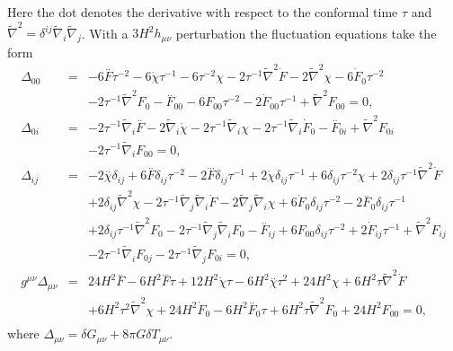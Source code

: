 %
Here the dot denotes the derivative with respect to the conformal time $\tau$ and $\tilde{\nabla}^2=\delta^{ij}\tilde{\nabla}_i\tilde{\nabla}_j$. With a $3H^2h_{\mu\nu}$ perturbation  the fluctuation equations take the form
%
\begin{eqnarray}
\Delta_{00}&=& -6 \overset{..}{F} \tau^{-2} - 6 \dot{\chi} \tau^{-1} - 6 \tau^{-2} \chi - 2 \tau^{-1} \tilde{\nabla}^2\dot{F} - 2 \tilde{\nabla}^2\chi -6 \dot{F}_{0} \tau^{-2} 
\nonumber\\
&&- 2 \tau^{-1} \tilde{\nabla}^2F_{0}
- \overset{..}{F}_{00} 
- 6 F_{00} \tau^{-2} - 2 \dot{F}_{00} \tau^{-1} + \tilde{\nabla}^2F_{00}=0,
\nonumber\\ 
\Delta_{0i}&=& -2 \tau^{-1} \tilde{\nabla}_{i}\overset{..}{F} - 2 \tilde{\nabla}_{i}\dot{\chi} - 2 \tau^{-1} \tilde{\nabla}_{i}\chi -2 \tau^{-1} \tilde{\nabla}_{i}\dot{F}_{0}- \overset{..}{F}_{0i} + \tilde{\nabla}^2F_{0i} 
\nonumber\\
&&- 2 \tau^{-1} \tilde{\nabla}_{i}F_{00}=0,
\nonumber\\ 
\Delta_{ij}&=& -2 \overset{..}{\chi}\delta_{ij} + 6 \overset{..}{F}\delta_{ij} \tau^{-2} - 2 \overset{...}{F}\delta_{ij} \tau^{-1} + 2 \dot{\chi}\delta_{ij} \tau^{-1} + 6\delta_{ij} \tau^{-2} \chi + 2\delta_{ij} \tau^{-1} \tilde{\nabla}^2\dot{F} 
\nonumber\\
&&+ 2\delta_{ij} \tilde{\nabla}^2\chi 
 - 2 \tau^{-1} \tilde{\nabla}_{j}\tilde{\nabla}_{i}\dot{F} - 2 \tilde{\nabla}_{j}\tilde{\nabla}_{i}\chi +6 \dot{F}_{0}\delta_{ij} \tau^{-2} - 2 \overset{..}{F}_{0}\delta_{ij} \tau^{-1} 
 \nonumber\\
 &&+ 2\delta_{ij} \tau^{-1} \tilde{\nabla}^2F_{0}  - 2 \tau^{-1} \tilde{\nabla}_{j}\tilde{\nabla}_{i}F_{0}- \overset{..}{F}_{ij} + 6 F_{00}\delta_{ij} \tau^{-2} + 2 \dot{F}_{ij} \tau^{-1} + \tilde{\nabla}^2F_{ij}
 \nonumber\\
 && -2 \tau^{-1} \tilde{\nabla}_{i}F_{0j} - 2 \tau^{-1} \tilde{\nabla}_{j}F_{0i}=0,
\nonumber\\
g^{\mu\nu}\Delta_{\mu\nu} &=& 24 H^2 \overset{..}{F} - 6 H^2 \overset{...}{F} \tau + 12 H^2 \dot{\chi} \tau - 6 H^2 \overset{..}{\chi} \tau^2 + 24 H^2 \chi + 6 H^2 \tau \tilde{\nabla}^2\dot{F} 
\nonumber \\ 
&& + 6 H^2 \tau^2 \tilde{\nabla}^2\chi +24 H^2 \dot{F}_{0} - 6 H^2 \overset{..}{F}_{0} \tau + 6 H^2 \tau \tilde{\nabla}^2F_{0}+24 H^2 F_{00}=0,
\nonumber\\
\label{6.53}
\end{eqnarray}
%
where $\Delta_{\mu\nu}=\delta G_{\mu\nu}+8\pi G \delta T_{\mu\nu}$.

